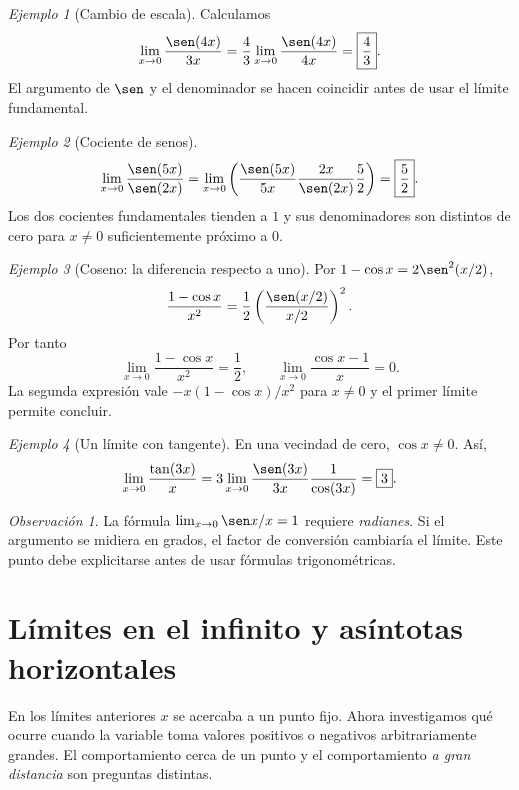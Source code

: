\documentclass[12pt]{article}
\theoremstyle{remark}
\newtheorem{observacion}{Observación}
\newtheorem{ejemplo}{Ejemplo}
\begin{document}
\begin{ejemplo}[Cambio de escala]
Calculamos
\[
 \lim_{x\to0}\frac{\sen(4x)}{3x}
 =\frac43\lim_{x\to0}\frac{\sen(4x)}{4x}
 =\boxed{\frac43}.
\]
El argumento de $\sen$ y el denominador se hacen coincidir antes de usar el límite fundamental.
\end{ejemplo}

\begin{ejemplo}[Cociente de senos]
\[
 \lim_{x\to0}\frac{\sen(5x)}{\sen(2x)}
 =\lim_{x\to0}\left(\frac{\sen(5x)}{5x}\frac{2x}{\sen(2x)}\frac52\right)
 =\boxed{\frac52}.
\]
Los dos cocientes fundamentales tienden a $1$ y sus denominadores son distintos de cero para $x\ne0$ suficientemente próximo a $0$.
\end{ejemplo}

\begin{ejemplo}[Coseno: la diferencia respecto a uno]
Por $1-\cos x=2\sen^2(x/2)$,
\[
 \frac{1-\cos x}{x^2}
 =\frac12\left(\frac{\sen(x/2)}{x/2}\right)^2.
\]
Por tanto
\[
 \boxed{\lim_{x\to0}\frac{1-\cos x}{x^2}=\frac12},\qquad
 \boxed{\lim_{x\to0}\frac{\cos x-1}{x}=0}.
\]
La segunda expresión vale $-x(1-\cos x)/x^2$ para $x\ne0$ y el primer límite permite concluir.
\end{ejemplo}

\begin{ejemplo}[Un límite con tangente]
En una vecindad de cero, $\cos x\ne0$. Así,
\[
 \lim_{x\to0}\frac{\tan(3x)}x
 =3\lim_{x\to0}\frac{\sen(3x)}{3x}\frac1{\cos(3x)}=\boxed3.
\]
\end{ejemplo}

\begin{observacion}
La fórmula $\lim_{x\to0}\sen x/x=1$ requiere \emph{radianes}. Si el argumento se midiera en grados, el factor de conversión cambiaría el límite. Este punto debe explicitarse antes de usar fórmulas trigonométricas.
\end{observacion}

\section{Límites en el infinito y asíntotas horizontales}
En los límites anteriores $x$ se acercaba a un punto fijo. Ahora investigamos qué ocurre cuando la variable toma valores positivos o negativos arbitrariamente grandes. El comportamiento cerca de un punto y el comportamiento \emph{a gran distancia} son preguntas distintas.
\end{document}
